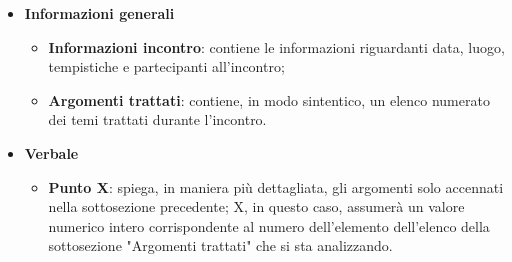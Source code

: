                 \begin{itemize}
                    \item \textbf{Informazioni generali}
                    \begin{itemize}
                        \item \textbf{Informazioni incontro}: contiene le informazioni riguardanti data, luogo, tempistiche e partecipanti all'incontro;
                        \item \textbf{Argomenti trattati}: contiene, in modo sintentico, un elenco numerato dei temi trattati durante l'incontro.
                    \end{itemize}
                    \item \textbf{Verbale}
                    \begin{itemize}
                        \item \textbf{Punto X}: spiega, in maniera più dettagliata, gli argomenti solo accennati nella sottosezione precedente; X, in questo caso, assumerà un valore numerico intero corrispondente al numero dell'elemento dell'elenco della sottosezione "Argomenti trattati" che si sta analizzando.
                    \end{itemize}
                \end{itemize}
